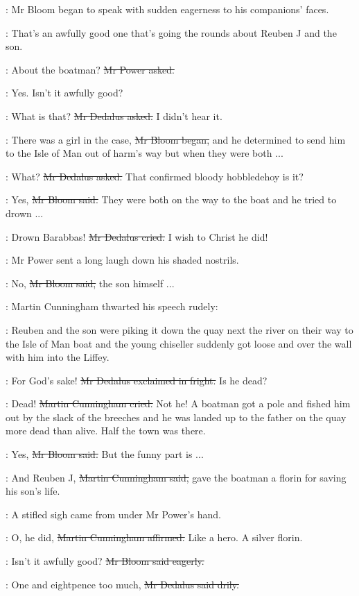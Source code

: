 :
Mr Bloom began to speak with sudden eagerness to his companions' faces.

\Bloom:
That's an awfully good one that's going the rounds
about Reuben J and the son.

\power:
About the boatman?
\sout{Mr Power asked.}

\Bloom:
Yes.
Isn't it awfully good?

\simon:
What is that?
\sout{Mr Dedalus asked.}
I didn't hear it.

\Bloom:
There was a girl in the case,
\sout{Mr Bloom began,}
and he determined to send him
to the Isle of Man out of harm's way
but when they were both ...

\simon:
What?
\sout{Mr Dedalus asked.}
That confirmed bloody hobbledehoy is it?

\Bloom:
Yes,
\sout{Mr Bloom said.}
They were both on the way to the boat and he tried to drown ...

\simon:
Drown Barabbas!
\sout{Mr Dedalus cried.}
I wish to Christ he did!

:
Mr Power sent a long laugh down his shaded nostrils.

\Bloom:
No,
\sout{Mr Bloom said,}
the son himself ...

:
Martin Cunningham thwarted his speech rudely:

\cunningham:
Reuben and the son were piking it down the quay next the river
on their way to the Isle of Man boat
and the young chiseller suddenly got loose
and over the wall with him into the Liffey.

\simon:
For God's sake!
\sout{Mr Dedalus exclaimed in fright.}
Is he dead?

\cunningham:
Dead!
\sout{Martin Cunningham cried.}
Not he!
A boatman got a pole and fished him out by the slack of the breeches
and he was landed up to the father on the quay
more dead than alive.
Half the town was there.

\Bloom:
Yes,
\sout{Mr Bloom said.}
But the funny part is ...

\cunningham:
And Reuben J,
\sout{Martin Cunningham said,}
gave the boatman a florin for saving his son's life.

:
A stifled sigh came from under Mr Power's hand.

\cunningham:
O, he did,
\sout{Martin Cunningham affirmed.}
Like a hero.
A silver florin.

\Bloom:
Isn't it awfully good?
\sout{Mr Bloom said eagerly.}

\simon:
One and eightpence too much,
\sout{Mr Dedalus said drily.}

